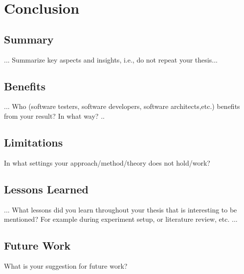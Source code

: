 
\chapter{Conclusion}\label{chap:conclusion}


\section{Summary}
... Summarize key aspects and insights, i.e., do not repeat your thesis...
\section{Benefits}
... Who (software testers, software developers, software architects,etc.) benefits from your result? In what way?   ..
\section{Limitations}
In what settings your approach/method/theory does not hold/work?
\section{Lessons Learned}
... What lessons did you learn throughout your thesis that is interesting to be mentioned? For example during experiment setup, or literature review, etc. ... 
\section{Future Work}
What is your suggestion for future work?